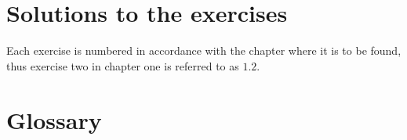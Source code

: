 \documentclass[11pt,twoside]{book}
\theoremstyle{definition}
\theoremstyle{remark}
\begin{document}
\printindex

\begin{appendices}
\chapter{Solutions to the exercises}
Each exercise is numbered in accordance with the chapter where it is to be found, thus exercise two in chapter one is referred to as $1.2$.
\shipoutAnswer
\chapter{Glossary}
\printglossaries
\end{appendices}
\end{document}
